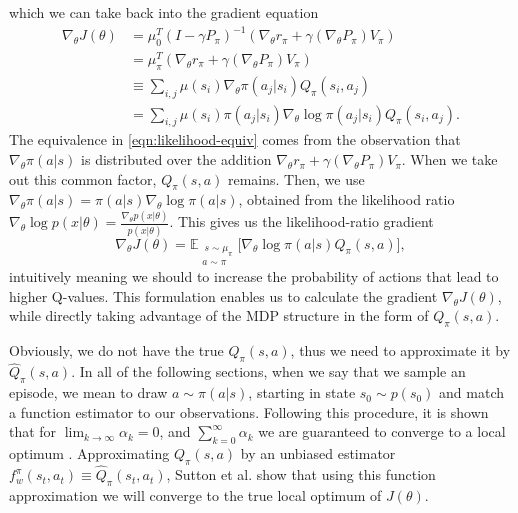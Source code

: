 \documentclass[final]{IEEEtran}
\begin{document}
which we can take back into the gradient equation 
\begin{align}
	\nabla_\theta J(\theta) &= \mu_0^T (I - \gamma P_\pi)^{-1} (\nabla_\theta r_\pi + \gamma (\nabla_\theta P_\pi) V_\pi) \nonumber
	\\ &= \mu_\pi^T (\nabla_\theta r_\pi + \gamma (\nabla_\theta P_\pi) V_\pi) \nonumber
	\\ &\equiv \sum\nolimits_{i,j} \mu(s_i) \nabla_\theta\pi(a_j|s_i) Q_\pi(s_i,a_j) \label{eqn:likelihood-equiv}
	\\ &= \sum\nolimits_{i,j} \mu(s_i) \pi(a_j|s_i) \nabla_\theta\log\pi(a_j|s_i) Q_\pi(s_i,a_j). \nonumber
\end{align}
The equivalence in \eqref{eqn:likelihood-equiv} comes from the observation that $\nabla_\theta \pi(a|s)$ is distributed over the addition $\nabla_\theta r_\pi + \gamma (\nabla_\theta P_\pi) V_\pi$.
When we take out this common factor, $Q_\pi(s,a)$ remains.
Then, we use $\nabla_\theta \pi(a|s) = \pi(a|s)\nabla_\theta\log\pi(a|s)$, obtained from the likelihood ratio $\nabla_\theta \log p(x|\theta) = \frac{\nabla_\theta p(x|\theta)}{p(x|\theta)}$. 
This gives us the likelihood-ratio gradient
\begin{equation}
	\nabla_\theta J(\theta) = \mathbb{E}_{\substack{\ s \sim \mu_\pi \\a \sim \pi}} \Big[\nabla_\theta{\log\pi(a|s)}Q_\pi(s,a)\Big],
	\label{eqn:like-grad}
\end{equation}
intuitively meaning we should to increase the probability of actions that lead to higher Q-values.
This formulation enables us to calculate the gradient $\nabla_\theta J(\theta)$, while directly taking advantage of the MDP structure in the form of $Q_\pi(s,a)$.

Obviously, we do not have the true $Q_\pi(s,a)$, thus we need to approximate it by $\hat{Q}_\pi(s,a)$. 
In all of the following sections, when we say that we sample an episode, we mean to draw $a \sim \pi(a|s)$, starting in state $s_0 \sim p(s_0)$ and match a function estimator to our observations.
Following this procedure, it is shown that for $\lim_{k\to\infty}\alpha_k = 0$, and $\sum_{k=0}^\infty \alpha_k$ we are guaranteed to converge to a local optimum \cite{Sutton:1999:PGM:3009657.3009806}.
Approximating $Q_\pi(s,a)$ by an unbiased estimator $f_w^\pi(s_t, a_t) \equiv \hat{Q}_\pi(s_t, a_t)$, Sutton et al. \cite{Sutton:1999:PGM:3009657.3009806} show that using this function approximation we will converge to the true local optimum of $J(\theta)$.
\end{document}
